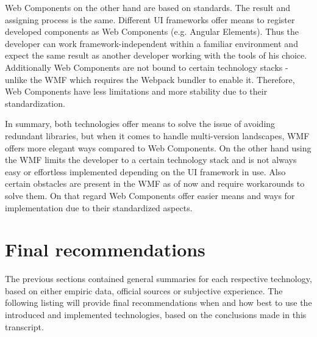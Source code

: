Web Components on the other hand are based on standards. The result and assigning process is the same. Different UI frameworks offer means to register developed components as Web Components (e.g. Angular Elements). Thus the developer can work framework-independent within a familiar environment and expect the same result as another developer working with the tools of his choice.
Additionally Web Components are not bound to certain technology stacks - unlike the WMF which requires the Webpack bundler to enable it. Therefore, Web Components have less limitations and more stability due to their standardization.

In summary, both technologies offer means to solve the issue of avoiding redundant libraries, but when it comes to handle multi-version landscapes, WMF offers more elegant ways compared to Web Components. On the other hand using the WMF limits the developer to a certain technology stack and is not always easy or effortless implemented depending on the UI framework in use. Also certain obstacles are present in the WMF as of now and require workarounds to solve them.\cite{wmf_the_good_and_ugly} On that regard Web Components offer easier means and ways for implementation due to their standardized aspects.

\section{Final recommendations}

The previous sections contained general summaries for each respective technology, based on either empiric data, official sources or subjective experience. The following listing will provide final recommendations when and how best to use the introduced and implemented technologies, based on the conclusions made in this transcript.

